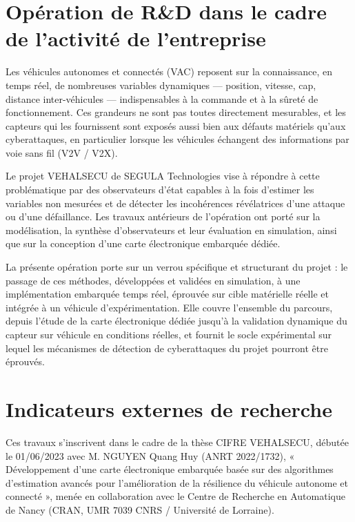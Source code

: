 \section{Opération de R\&D dans le cadre de l’activité de l’entreprise}

Les véhicules autonomes et connectés (VAC) reposent sur la connaissance, en temps réel, de nombreuses variables dynamiques — position, vitesse, cap, distance inter-véhicules — indispensables à la commande et à la sûreté de fonctionnement. Ces grandeurs ne sont pas toutes directement mesurables, et les capteurs qui les fournissent sont exposés aussi bien aux défauts matériels qu’aux cyberattaques, en particulier lorsque les véhicules échangent des informations par voie sans fil (V2V / V2X).

Le projet VEHALSECU de SEGULA Technologies vise à répondre à cette problématique par des observateurs d’état capables à la fois d’estimer les variables non mesurées et de détecter les incohérences révélatrices d’une attaque ou d’une défaillance. Les travaux antérieurs de l’opération ont porté sur la modélisation, la synthèse d’observateurs et leur évaluation en simulation, ainsi que sur la conception d’une carte électronique embarquée dédiée.

La présente opération porte sur un verrou spécifique et structurant du projet : le passage de ces méthodes, développées et validées en simulation, à une implémentation embarquée temps réel, éprouvée sur cible matérielle réelle et intégrée à un véhicule d’expérimentation. Elle couvre l’ensemble du parcours, depuis l’étude de la carte électronique dédiée jusqu’à la validation dynamique du capteur sur véhicule en conditions réelles, et fournit le socle expérimental sur lequel les mécanismes de détection de cyberattaques du projet pourront être éprouvés.

\section{Indicateurs externes de recherche}

Ces travaux s’inscrivent dans le cadre de la thèse CIFRE VEHALSECU, débutée le 01/06/2023 avec M. NGUYEN Quang Huy (ANRT 2022/1732), « Développement d’une carte électronique embarquée basée sur des algorithmes d’estimation avancés pour l’amélioration de la résilience du véhicule autonome et connecté », menée en collaboration avec le Centre de Recherche en Automatique de Nancy (CRAN, UMR 7039 CNRS / Université de Lorraine).


